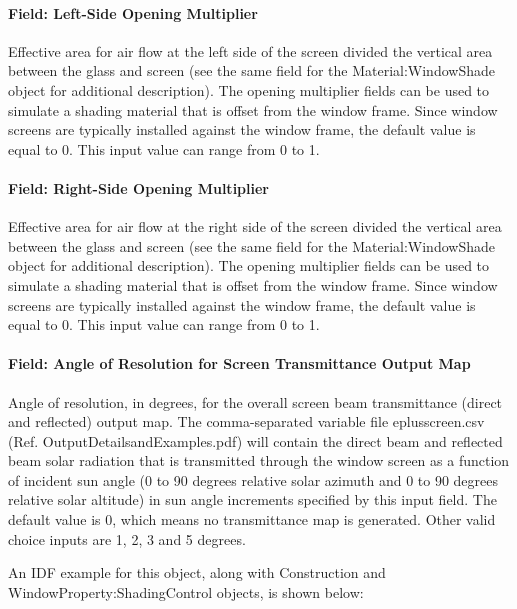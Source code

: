 \paragraph{Field: Left-Side Opening Multiplier}\label{field-left-side-opening-multiplier-2}

Effective area for air flow at the left side of the screen divided the vertical area between the glass and screen (see the same field for the Material:WindowShade object for additional description). The opening multiplier fields can be used to simulate a shading material that is offset from the window frame. Since window screens are typically installed against the window frame, the default value is equal to 0. This input value can range from 0 to 1.

\paragraph{Field: Right-Side Opening Multiplier}\label{field-right-side-opening-multiplier-2}

Effective area for air flow at the right side of the screen divided the vertical area between the glass and screen (see the same field for the Material:WindowShade object for additional description). The opening multiplier fields can be used to simulate a shading material that is offset from the window frame. Since window screens are typically installed against the window frame, the default value is equal to 0. This input value can range from 0 to 1.

\paragraph{Field: Angle of Resolution for Screen Transmittance Output Map}\label{field-angle-of-resolution-for-screen-transmittance-output-map}

Angle of resolution, in degrees, for the overall screen beam transmittance (direct and reflected) output map. The comma-separated variable file eplusscreen.csv (Ref. OutputDetailsandExamples.pdf) will contain the direct beam and reflected beam solar radiation that is transmitted through the window screen as a function of incident sun angle (0 to 90 degrees relative solar azimuth and 0 to 90 degrees relative solar altitude) in sun angle increments specified by this input field. The default value is 0, which means no transmittance map is generated. Other valid choice inputs are 1, 2, 3 and 5 degrees.

An IDF example for this object, along with Construction and WindowProperty:ShadingControl objects, is shown below:

